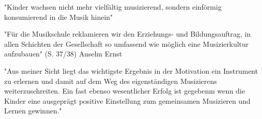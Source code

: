"Kinder wachsen nicht mehr vielfältig musizierend, sondern einförmig
konsumierend in die Musik hinein" \autocite[37]{ernst:die_zukunftsfaehige_musikschule}

"Für die Musikschule reklamieren wir den Erziehungs- und Bildungsauftrag, in
allen Schichten der Gesellschaft so umfassend wie möglich eine Musizierkultur
aufzubauen" (S. 37/38) Anselm Ernst

"Aus meiner Sicht liegt das wichtigste Ergebnis in der Motivation ein Instrument
zu erlernen und damit auf dem Weg des eigenständigen Musizierens
weiterzuschreiten. Ein fast ebenso wesentlicher Erfolg ist gegebenm wenn die
Kinder eine ausgeprägt positive Einstellung zum gemeinsamen Musizieren und
Lernen gewinnen." \autocite[40]{ernst:die_zukunftsfaehige_musikschule}

